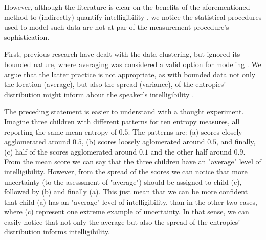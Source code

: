 \begin{comment}
	
	As the literature suggests, objective rating procedures produce more valid\footnote{validity is understood as the extent to which scores are appropriate for their intended interpretation and use \citep{Lesterhuis_2018, Trochim_2022}.} and reliable\footnote{reliability is though as the extend to which a measure would give us the same result over and over again \citep{Trochim_2022}, i.e. measure something, free from error, in a consistent way.} scores than any other available procedure \citep{Boonen_et_al_2021, Faes_et_al_2021}, as the method does not hinge in the use or production of a \textit{subjective rating scale}, i.e. a scale based on a personal perception of the child's intelligibility. Moreover, the previous advantages are further emphasized by the use of stimuli gathered from spontaneous speech tasks, as they have a greater level of ecological validity, especially compared to contextualized utterances or reading at loud tasks \citep{Flipsen_2006, Ertmer_2011}.
	
\end{comment}

However, although the literature is clear on the benefits of the aforementioned method to (indirectly) quantify intelligibility \citep{Boonen_et_al_2020, Boonen_et_al_2021, Hustad_et_al_2020}, we notice the statistical procedures used to model such data are not at par of the measurement procedure's sophistication.

First, previous research have dealt with the data clustering, but ignored its bounded nature, where averaging was considered a valid option for modeling \citep{Boonen_et_al_2021}. We argue that the latter practice is not appropriate, as with bounded data not only the location (average), but also the spread (variance), of the entropies' distribution might inform about the speaker's intelligibility \citep{Nelder_et_al_1983}.

The preceding statement is easier to understand with a thought experiment. Imagine three children with different patterns for ten entropy measures, all reporting the same mean entropy of $0.5$. The patterns are: (a) scores closely agglomerated around $0.5$, (b) scores loosely aglomerated around $0.5$, and finally, (c) half of the scores agglomerated around $0.1$ and the other half around $0.9$. From the mean score we can say that the three children have an "average" level of intelligibility. However, from the spread of the scores we can notice that more uncertainty (to the asesssment of "average") should be assigned to child (c), followed by (b) and finally (a). This just mean that we can be more confident that child (a) has an "average" level of intelligibility, than in the other two cases, where (c) represent one extreme example of uncertainty. In that sense, we can easily notice that not only the average but also the spread of the entropies' distribution informs intelligibility.

